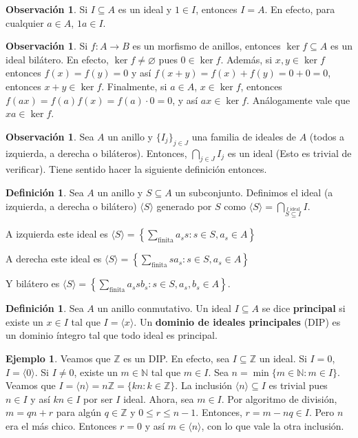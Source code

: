 \documentclass[12pt]{book}
\theoremstyle{definition}
\newtheorem{obs}[teo]{Observación}
\newtheorem{defn}[teo]{Definición}
\newtheorem{ex}[teo]{Ejemplo}
\newcommand{\ZZ}{\mathbb{Z}}      %
\newcommand{\NN}{\mathbb{N}}
\let\emptyset\varnothing
\begin{document}
\begin{obs}
Si $I\subseteq A$ es un ideal y $1\in I$, entonces $I=A$. En efecto, para cualquier $a\in A$, $1a\in I$.
\end{obs}

\begin{obs}
Si $f:A\to B$ es un morfismo de anillos, entonces $\ker f\subseteq A$ es un ideal bilátero. En efecto, $\ker f \neq \emptyset$ pues $0\in \ker f$. Además, si $x,y\in \ker f$ entonces $f(x)=f(y)=0$ y así $f(x+y)=f(x)+f(y)=0+0=0$, entonces $x+y\in \ker f$. Finalmente, si $a\in A$, $x\in \ker f$, entonces $f(ax)=f(a)f(x)=f(a)\cdot 0 = 0$, y así $ax\in \ker f$. Análogamente vale que $xa \in \ker f$.
\end{obs}

\begin{obs}
Sea $A$ un anillo y $\{I_j\}_{j\in J}$ una familia de ideales de $A$ (todos a izquierda, a derecha o biláteros). Entonces, $\displaystyle\bigcap_{j\in J} I_j$ es un ideal (Esto es trivial de verificar). Tiene sentido hacer la siguiente definición entonces.
\end{obs}

\begin{defn}
Sea $A$ un anillo y $S\subseteq A$ un subconjunto. Definimos el ideal (a izquierda, a derecha o bilátero) $\langle S\rangle$ generado por $S$ como $\langle S\rangle = \displaystyle\bigcap_{\stackrel{I \text{ ideal}}{S\subseteq I}}I$. 

A izquierda este ideal es $\langle S\rangle =\left\{\displaystyle\sum_{\text{finita}} a_s s : s\in S , a_s\in A\right\}$

A derecha este ideal es $\langle S\rangle = \left\{\displaystyle\sum_{\text{finita}} sa_s : s\in S, a_s\in A\right\}$ 

Y bilátero es $\langle S\rangle = \left\{\displaystyle\sum_{\text{finita}}a_ssb_s : s\in S, a_s,b_s\in A\right\}$.
\end{defn}

\begin{defn}
Sea $A$ un anillo conmutativo. Un ideal $I\subseteq A$ se dice \textbf{principal} si existe un $x\in I$ tal que $I=\langle x\rangle$. Un \textbf{dominio de ideales principales} (DIP) es un dominio íntegro tal que todo ideal es principal.
\end{defn}

\begin{ex}
Veamos que $\ZZ$ es un DIP. En efecto, sea $I\subseteq \ZZ$ un ideal. Si $I=0$, $I=\langle 0\rangle$. Si $I\neq 0$, existe un $m\in\NN$ tal que $m\in I$. Sea $n=\min \{m\in\NN : m\in I\}$. Veamos que $I=\langle n\rangle = n\ZZ = \{kn : k\in\ZZ\}$. La inclusión $\langle n\rangle \subseteq I$ es trivial pues $n\in I$ y así $kn\in I$ por ser $I$ ideal. Ahora, sea $m\in I$. Por algoritmo de división, $m=qn+r$ para algún $q\in \ZZ$ y $0\leq r\leq n-1$. Entonces, $r=m-nq\in I$. Pero $n$ era el más chico. Entonces $r=0$ y así $m\in \langle n\rangle$, con lo que vale la otra inclusión.
\end{ex}
\end{document}
